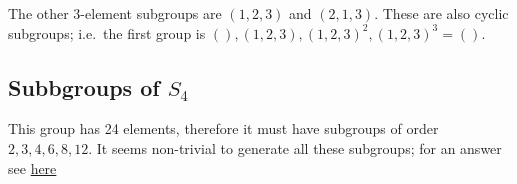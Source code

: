 The other 3-element subgroups are \((1,2,3)\) and \((2,1,3)\). These are
also cyclic subgroups; i.e.~the first group is
\((), (1,2,3), (1,2,3)^2, (1,2,3)^3 = ()\).

\subsection{\texorpdfstring{Subbgroups of
\(S_4\)}{Subbgroups of S\_4}}\label{subbgroups-of-s_4}

This group has 24 elements, therefore it must have subgroups of order
\(2,3,4,6,8,12\). It seems non-trivial to generate all these subgroups;
for an answer see
\href{https://math.stackexchange.com/questions/379841/how-to-enumerate-subgroups-of-each-order-of-s-4-by-hand?lq=1}{here}
